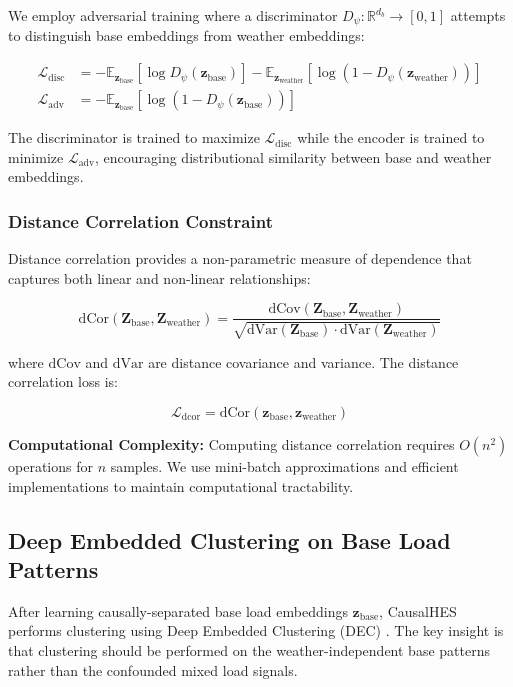 \documentclass[journal]{IEEEtran}
\begin{document}
We employ adversarial training where a discriminator $D_\psi: \mathbb{R}^{d_b} \rightarrow [0,1]$ attempts to distinguish base embeddings from weather embeddings:

\begin{align}
\mathcal{L}_{\text{disc}} &= -\mathbb{E}_{\mathbf{z}_{\text{base}}}[\log D_\psi(\mathbf{z}_{\text{base}})] - \mathbb{E}_{\mathbf{z}_{\text{weather}}}[\log(1 - D_\psi(\mathbf{z}_{\text{weather}}))] \label{eq:discriminator_loss}\\
\mathcal{L}_{\text{adv}} &= -\mathbb{E}_{\mathbf{z}_{\text{base}}}[\log(1 - D_\psi(\mathbf{z}_{\text{base}}))] \label{eq:adversarial_loss}
\end{align}

The discriminator is trained to maximize $\mathcal{L}_{\text{disc}}$ while the encoder is trained to minimize $\mathcal{L}_{\text{adv}}$, encouraging distributional similarity between base and weather embeddings.

\subsubsection{Distance Correlation Constraint}

Distance correlation \cite{szekely2007measuring} provides a non-parametric measure of dependence that captures both linear and non-linear relationships:

\begin{equation}
\text{dCor}(\mathbf{Z}_{\text{base}}, \mathbf{Z}_{\text{weather}}) = \frac{\text{dCov}(\mathbf{Z}_{\text{base}}, \mathbf{Z}_{\text{weather}})}{\sqrt{\text{dVar}(\mathbf{Z}_{\text{base}}) \cdot \text{dVar}(\mathbf{Z}_{\text{weather}})}}
\label{eq:dcor_definition}
\end{equation}

where $\text{dCov}$ and $\text{dVar}$ are distance covariance and variance. The distance correlation loss is:

\begin{equation}
\mathcal{L}_{\text{dcor}} = \text{dCor}(\mathbf{z}_{\text{base}}, \mathbf{z}_{\text{weather}})
\label{eq:dcor_loss}
\end{equation}

\textbf{Computational Complexity:} Computing distance correlation requires $O(n^2)$ operations for $n$ samples. We use mini-batch approximations and efficient implementations to maintain computational tractability.

\subsection{Deep Embedded Clustering on Base Load Patterns}
After learning causally-separated base load embeddings $\mathbf{z}_{\text{base}}$, CausalHES performs clustering using Deep Embedded Clustering (DEC) \cite{deep_embedding_clustering_xie}. The key insight is that clustering should be performed on the weather-independent base patterns rather than the confounded mixed load signals.
\end{document}
